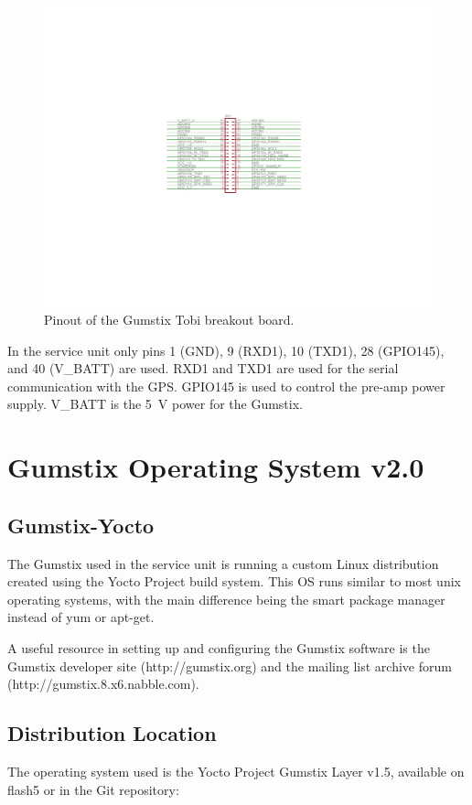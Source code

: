\begin{figure}[ht!]
   \centering
   \includegraphics[scale=1]{Appendix/Figures/tobi_pinout.pdf}
   \caption{Pinout of the Gumstix Tobi breakout board.}
   \label{app:gumstix:fig:tobi}
\end{figure}

In the service unit only pins 1 (GND), 9 (RXD1), 10 (TXD1), 28 (GPIO145), and 40 (V\_BATT) are used.
RXD1 and TXD1 are used for the serial communication with the GPS.
GPIO145 is used to control the pre-amp power supply.
V\_BATT is the 5~V power for the Gumstix.

\section{Gumstix Operating System v2.0}

\subsection{Gumstix-Yocto}

The Gumstix used in the service unit is running a custom Linux distribution created using the Yocto Project build system.
This OS runs similar to most unix operating systems, with the main difference being the smart package manager instead of yum or apt-get.

A useful resource in setting up and configuring the Gumstix software is the Gumstix developer site (http://gumstix.org) and the mailing list archive forum (http://gumstix.8.x6.nabble.com).

\subsection{Distribution Location}
\label{app:gum:distribution}
The operating system used is the Yocto Project Gumstix Layer v1.5, available on flash5 or in the Git repository:

